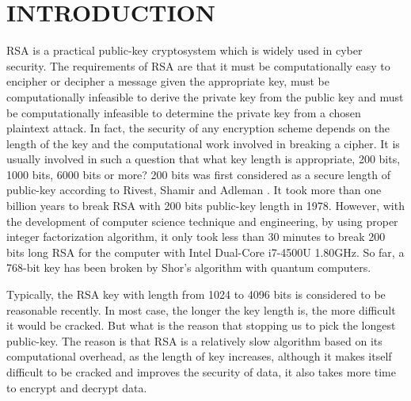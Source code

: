 \documentclass[12pt, oneside]{book}
\begin{document}
\newpage
{} %
\pagestyle{fancy}
\lhead{} \chead{} \rhead{\normalsize\thepage} %
\lfoot{} \cfoot{} \rfoot{}
\renewcommand{\headrulewidth}{0pt}
\renewcommand{\footrulewidth}{0pt}

\chapter{\textbf{INTRODUCTION}}
RSA is a practical public-key cryptosystem which is widely used in cyber security. The requirements of RSA are that it must be computationally easy to encipher or decipher a message given the appropriate key, must be computationally infeasible to derive the private key from the public key and must be computationally infeasible to determine the private key from a chosen plaintext attack. In fact, the security of any encryption scheme depends on the length of the key and the computational work involved in breaking a cipher. It is usually involved in such a question that what key length is appropriate, 200 bits, 1000 bits, 6000 bits or more? 200 bits was first considered as a secure length of public-key according to Rivest, Shamir and Adleman \cite{rivest1978a}. It took more than one billion years to break RSA with 200 bits public-key length in 1978. However, with the development of computer science technique and engineering, by using proper integer factorization algorithm, it only took less than 30 minutes to break 200 bits long RSA for the computer with Intel Dual-Core i7-4500U 1.80GHz. So far, a 768-bit key has been broken by Shor’s algorithm with quantum computers.\par
Typically, the RSA key with length from 1024 to 4096 bits is considered to be reasonable recently. In most case, the longer the key length is, the more difficult it would be cracked. But what is the reason that stopping us to pick the longest public-key. The reason is that RSA is a relatively slow algorithm based on its computational overhead, as the length of key increases, although it makes itself difficult to be cracked and improves the security of data, it also takes more time to encrypt and decrypt data.\par
\end{document}
